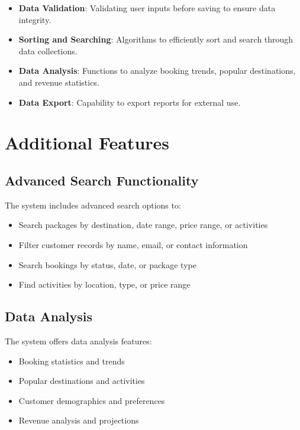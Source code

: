 \documentclass[12pt]{article}
\begin{document}
\begin{itemize}
    \item \textbf{Data Validation}: Validating user inputs before saving to ensure data integrity.
    
    \item \textbf{Sorting and Searching}: Algorithms to efficiently sort and search through data collections.
    
    \item \textbf{Data Analysis}: Functions to analyze booking trends, popular destinations, and revenue statistics.
    
    \item \textbf{Data Export}: Capability to export reports for external use.
\end{itemize}

\section{Additional Features}

\subsection{Advanced Search Functionality}
The system includes advanced search options to:
\begin{itemize}
    \item Search packages by destination, date range, price range, or activities
    \item Filter customer records by name, email, or contact information
    \item Search bookings by status, date, or package type
    \item Find activities by location, type, or price range
\end{itemize}

\subsection{Data Analysis}
The system offers data analysis features:
\begin{itemize}
    \item Booking statistics and trends
    \item Popular destinations and activities
    \item Customer demographics and preferences
    \item Revenue analysis and projections
\end{itemize}
\end{document}
